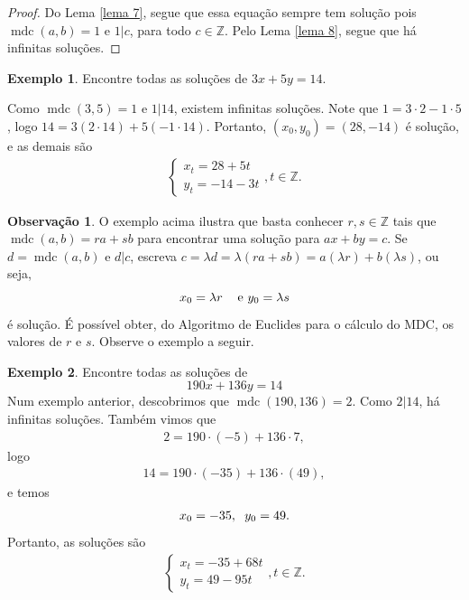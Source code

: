 \documentclass[a4paper,11pt,twoside, leqno]{article}
\DeclareMathOperator{\mdc}{mdc}
\theoremstyle{definition}
\newtheorem{remark}{Observação}[section]
\newtheorem*{example}{Exemplo}
\begin{document}
\begin{proof}
	Do Lema \eqref{lema 7}, segue que essa equação sempre tem solução pois $\mdc(a,b) = 1$ e $1|c$, para todo $c\in\mathbb{Z}$. Pelo Lema \eqref{lema 8}, segue que há infinitas soluções.
\end{proof}
\begin{example}
	Encontre todas as soluções de $3x + 5y = 14$.
	
	Como $\mdc(3,5) = 1$ e $1|14$, existem infinitas soluções. Note que $1 = 3\cdot 2 - 1\cdot 5$, logo $14 = 3(2\cdot 14) + 5(-1\cdot 14)$. Portanto, $(x_0, y_0) = (28,-14)$ é solução, e as demais são
	\begin{align*}
	\begin{cases}
	x_t = 28 + 5t \\
	y_t = -14 - 3t
	\end{cases}, t\in\mathbb{Z}.
	\end{align*}
\end{example}
\begin{remark}
	\label{obs 2}
	O exemplo acima ilustra que basta conhecer $r,s\in\mathbb{Z}$ tais que $\mdc(a,b) = ra + sb$ para encontrar uma solução para $ax + by = c$. Se $d = \mdc(a,b)$ e $d|c$, escreva $c = \lambda d = \lambda(ra + sb) = a(\lambda r) + b(\lambda s)$, ou seja,
	\begin{equation*}
	x_0 = \lambda r \hspace{0.3cm} \text{ e } y_0 = \lambda s
	\end{equation*}
	é solução. É possível obter, do Algoritmo de Euclides para o cálculo do MDC, os valores de $r$ e $s$. Observe o exemplo a seguir.
\end{remark}
\begin{example}
	Encontre todas as soluções de
	\begin{equation*}
	190x + 136y = 14
	\end{equation*}
	Num exemplo anterior, descobrimos que $\mdc(190,136) = 2$. Como $2|14$, há infinitas soluções. Também vimos que
	\begin{align*}
	2 = 190\cdot(-5) + 136\cdot 7,
	\end{align*}
	logo 
	\begin{align*}
	14 = 190\cdot(-35) + 136\cdot(49),
	\end{align*}
	e temos 
	\begin{align*}
	x_0 = -35, \hspace{0.2cm} y_0 = 49.
	\end{align*}
	Portanto, as soluções são
	\begin{align*}
	\begin{cases}
	x_t = -35 + 68t \\
	y_t = 49 - 95t
	\end{cases},t\in\mathbb{Z}.
	\end{align*}
\end{example}
\end{document}
